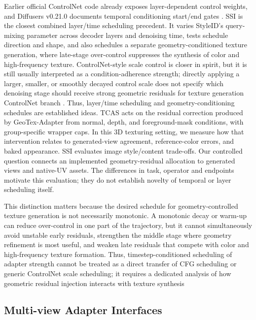 \documentclass[times,twocolumn,final]{elsarticle}
\providecommand{\DIFadd}[1]{{\protect\color{blue} \sf #1}} %
\providecommand{\DIFdel}[1]{{\protect\color{red} \scriptsize #1}} %
\providecommand{\DIFaddbegin}{} %
\providecommand{\DIFaddend}{} %
\providecommand{\DIFdelbegin}{} %
\providecommand{\DIFdelend}{} %
\begin{document}
\DIFadd{Earlier official ControlNet code already exposes layer-dependent control weights, and Diffusers v0.21.0 documents temporal conditioning start/end gates \cite{controlnet2023layercontrol,diffusers2023controlnet}. SSI is the closest combined layer/time scheduling precedent. It varies StyleID's query-mixing parameter \cite{chung2024styleid} across decoder layers and denoising time, tests schedule direction and shape, and also schedules a separate }\DIFaddend geometry-conditioned \DIFdelbegin \DIFdel{texture generation, where late-stage over-control suppresses the synthesis of color and high-frequency texture. ControlNet-style scale control is closer in spirit, but it is still usually interpreted as a condition-adherence strength; directly applying a larger, smaller, or smoothly decayed control scale does not specify which denoising stage should receive strong geometric residuals for texture generation}\DIFdelend \DIFaddbegin \DIFadd{ControlNet branch \cite{kulkarni2026ssi}. Thus, layer/time scheduling and geometry-conditioning schedules are established ideas. TCAS acts on the residual correction produced by GeoTex-Adapter from normal, depth, and foreground-mask conditions, with group-specific wrapper caps. In this 3D texturing setting, we measure how that intervention relates to generated-view agreement, reference-color errors, and baked appearance. SSI evaluates image style/content trade-offs. Our controlled question connects an implemented geometry-residual allocation to generated views and native-UV assets. The differences in task, operator and endpoints motivate this evaluation; they do not establish novelty of temporal or layer scheduling itself}\DIFaddend .

\DIFdelbegin \DIFdel{This distinction matters because the desired schedule for geometry-controlled texture generation is not necessarily monotonic. A monotonic decay or warm-up can reduce over-control in one part of the trajectory, but it cannot simultaneously avoid unstable early residuals, strengthen the middle stage where geometry refinement is most useful, and weaken late residuals that compete with color and high-frequency texture formation. Thus, timestep-conditioned scheduling of adapter strength cannot be treated as a direct transfer of CFG scheduling or generic ControlNet scale scheduling; it requires a dedicated analysis of how geometric residual injection interacts with texture synthesis}\DIFdelend \DIFaddbegin \subsection{Multi-view Adapter Interfaces}
\label{subsec:mvinterfaces}
\end{document}
